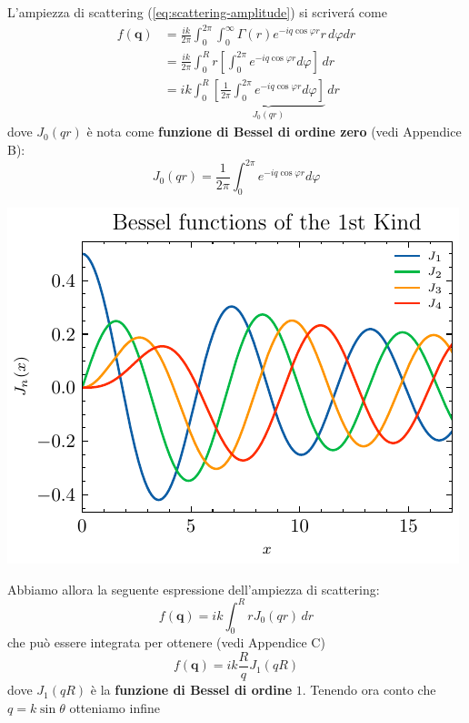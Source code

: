 L'ampiezza di scattering (\ref{eq:scattering-amplitude}) si scriverá come
\begin{align*}
	f(\bm{q}) & = \frac{ik}{2 \pi} \int_0^{2 \pi} \int_0^{\infty} \Gamma(r) e^{-iq \cos \varphi r} r \,d \varphi dr                      \\
	& = \frac{ik}{2 \pi} \int_0^R r \left[ \int_0^{2 \pi} e^{-iq \cos \varphi r} d \varphi \right] \, dr                       \\
	& = ik \int_0^R \underbrace{\left[ \frac{1}{2 \pi}\int_0^{2 \pi} e^{-iq \cos \varphi r} d \varphi \right]}_{J_0(qr)} \, dr
\end{align*}
dove \(J_0(qr)\) è nota come \textbf{funzione di Bessel di ordine zero} (vedi Appendice B):
\[
	J_0(qr) = \frac{1}{2 \pi}\int_0^{2 \pi} e^{-iq \cos \varphi r} d \varphi
\]
\begin{marginfigure}
	\centering
	\includegraphics[width = 1.25 \textwidth, height = 1.25 \textheight]{figs/bessel-functions-1stkind}
	\label{fig:bessel-func}
\end{marginfigure}
Abbiamo allora la seguente espressione dell'ampiezza di scattering:
\begin{equation}
	f(\bm{q}) = ik \int_0^R r J_0(qr) \, dr
	\label{eq:scattering-amplitude-bessel-zero}
\end{equation}
che può essere integrata per ottenere (vedi Appendice C)
\[
	f(\bm{q}) = ik \frac{R}{q} J_1(qR)
\]
dove \(J_1(qR)\) è la \textbf{funzione di Bessel di ordine} \(1\).
Tenendo ora conto che \(q = k \sin \theta\) otteniamo infine
